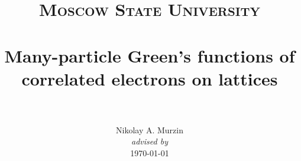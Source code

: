\title{
  \vspace{-1in}
  \normalfont \normalsize \textsc{Moscow State University} \\ [25pt]
  \horrule{0.5pt} \\[0.4cm]
  \huge Many-particle Green's functions of correlated electrons on lattices \\
  \horrule{2pt} \\[0.5cm]
}
\author{
  \normalfont
  \normalsize
  {Nikolay A. Murzin}\\[-3pt]
  \normalsize
  {\it{advised by} }\\[-3pt]
  \normalsize
  \today
}
\date{}